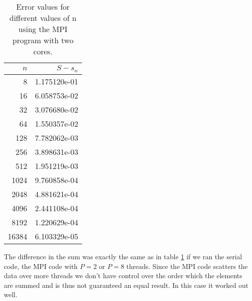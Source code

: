 \documentclass{article}
\begin{document}
\begin{table}
\centering
\caption{Error values for different values of n using the MPI program with two cores.}
\label{tab:MPIerror}
\begin{tabular}{rr}
$n$ & $S-s_n$  \\ 
\hline 
8     & 1.175120e-01 \\ 
16    & 6.058753e-02 \\ 
32    & 3.076680e-02 \\ 
64    & 1.550357e-02 \\ 
128   & 7.782062e-03 \\ 
256   & 3.898631e-03 \\ 
512   & 1.951219e-03 \\ 
1024  & 9.760858e-04 \\ 
2048  & 4.881621e-04 \\ 
4096  & 2.441108e-04 \\ 
8192  & 1.220629e-04 \\ 
16384 & 6.103329e-05
\end{tabular}
\end{table} 
  
  
The difference in the sum was exactly the same as in table \ref{tab:MPIerror} if we ran the serial code, the MPI code with $P =2$ or $P = 8$ threads. Since the MPI code scatters the data over more threads we don't have control over the order which the elements are summed and is thus not guaranteed an equal result. In this case it worked out well.
 
 
\end{document}
